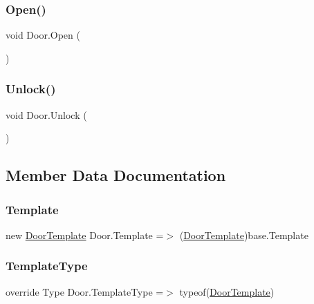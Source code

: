 \mbox{\label{class_door_a79629ef728511bbce03ebd1a3a133581}} 
\subsubsection{\texorpdfstring{Open()}{Open()}}
{\footnotesize\ttfamily void Door.\+Open (\begin{DoxyParamCaption}{ }\end{DoxyParamCaption})}

\mbox{\label{class_door_a11dace39b1b21cb04fc6508d6116f495}} 
\subsubsection{\texorpdfstring{Unlock()}{Unlock()}}
{\footnotesize\ttfamily void Door.\+Unlock (\begin{DoxyParamCaption}{ }\end{DoxyParamCaption})}



\subsection{Member Data Documentation}
\mbox{\label{class_door_a20367672205558145cfdf995176503af}} 
\subsubsection{\texorpdfstring{Template}{Template}}
{\footnotesize\ttfamily new \mbox{\hyperlink{class_door_template}{Door\+Template}} Door.\+Template =$>$ (\mbox{\hyperlink{class_door_template}{Door\+Template}})base.\+Template}

\mbox{\label{class_door_a279989c7a2f7605878ffb027b8687dea}} 
\subsubsection{\texorpdfstring{Template\+Type}{TemplateType}}
{\footnotesize\ttfamily override Type Door.\+Template\+Type =$>$ typeof(\mbox{\hyperlink{class_door_template}{Door\+Template}})\hspace{0.3cm}{\ttfamily [protected]}}



